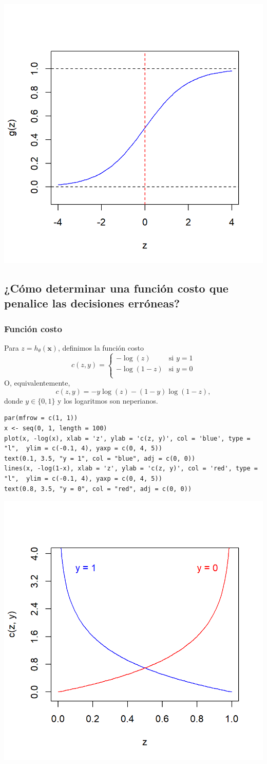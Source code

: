 \includegraphics[width=0.45\linewidth]{"Temas/Imágenes/Tema 3/screenshot001"}
\subsection{¿Cómo determinar una función costo que penalice las decisiones erróneas?}
\subsubsection{Función costo}
\begin{minipage}{0.45\textwidth}
	Para $z=h_\theta(\mathbf{x})$, definimos la función costo\[ c(z,y)=\begin{cases}
		-\log(z) & \text{si }y=1\\
		-\log(1-z) & \text{si }y=0\\
	\end{cases} \]
	O, equivalentemente, \[ c(z,y)=-y\log(z)-(1-y)\log(1-z), \] donde $y\in\{0,1\}$ y los logaritmos son neperianos.
\end{minipage}\quad\begin{minipage}{0.55\textwidth}
\begin{lstlisting}
par(mfrow = c(1, 1))
x <- seq(0, 1, length = 100)
plot(x, -log(x), xlab = 'z', ylab = 'c(z, y)', col = 'blue', type = "l",  ylim = c(-0.1, 4), yaxp = c(0, 4, 5))
text(0.1, 3.5, "y = 1", col = "blue", adj = c(0, 0))
lines(x, -log(1-x), xlab = 'z', ylab = 'c(z, y)', col = 'red', type = "l",  ylim = c(-0.1, 4), yaxp = c(0, 4, 5))
text(0.8, 3.5, "y = 0", col = "red", adj = c(0, 0))
\end{lstlisting}
\end{minipage}
\begin{flushright}
	\includegraphics[width=0.55\linewidth]{"Temas/Imágenes/Tema 3/screenshot002"}
\end{flushright}
